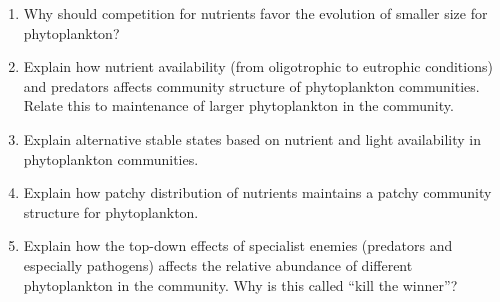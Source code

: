 \documentclass[letterpaper]{tufte-handout}
\begin{document}
\begin{enumerate}
	\item Why should competition for nutrients favor the evolution of smaller size for phytoplankton?
	
	\item Explain how nutrient availability (from oligotrophic to eutrophic conditions) and predators affects community structure of phytoplankton communities. Relate this to maintenance of larger phytoplankton in the community.
	
	\item Explain alternative stable states  based on nutrient and light availability in phytoplankton communities.
	
	\item Explain how patchy distribution of nutrients maintains a patchy community structure for phytoplankton.
	
	\item Explain how the top-down effects of specialist enemies (predators and especially pathogens) affects the relative abundance of different phytoplankton in the community. Why is this called ``kill the winner''?
	
\end{enumerate}
\end{document}
